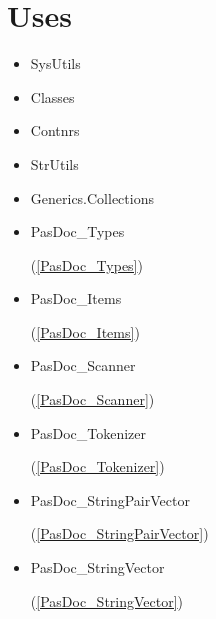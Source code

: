 \documentclass{report}
\begin{document}
\section{Uses}
\begin{itemize}
\item \begin{ttfamily}SysUtils\end{ttfamily}\item \begin{ttfamily}Classes\end{ttfamily}\item \begin{ttfamily}Contnrs\end{ttfamily}\item \begin{ttfamily}StrUtils\end{ttfamily}\item \begin{ttfamily}Generics.Collections\end{ttfamily}\item \begin{ttfamily}PasDoc{\_}Types\end{ttfamily}(\ref{PasDoc_Types})\item \begin{ttfamily}PasDoc{\_}Items\end{ttfamily}(\ref{PasDoc_Items})\item \begin{ttfamily}PasDoc{\_}Scanner\end{ttfamily}(\ref{PasDoc_Scanner})\item \begin{ttfamily}PasDoc{\_}Tokenizer\end{ttfamily}(\ref{PasDoc_Tokenizer})\item \begin{ttfamily}PasDoc{\_}StringPairVector\end{ttfamily}(\ref{PasDoc_StringPairVector})\item \begin{ttfamily}PasDoc{\_}StringVector\end{ttfamily}(\ref{PasDoc_StringVector})\end{itemize}
\end{document}
